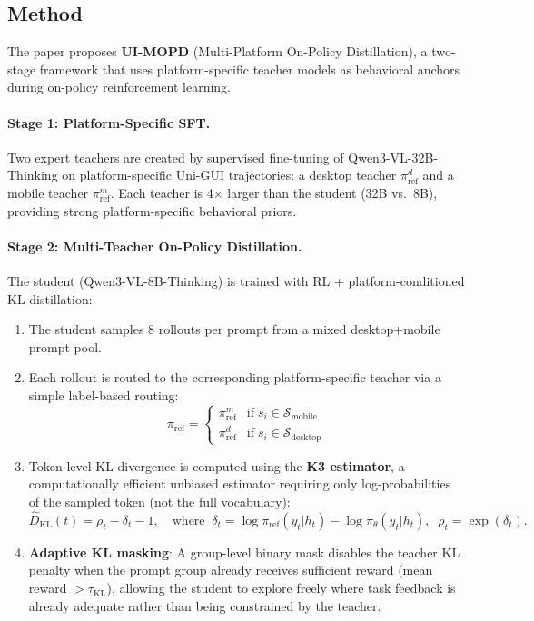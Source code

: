 \documentclass[11pt,a4paper]{article}
\begin{document}
\subsection{Method}

The paper proposes \textbf{UI-MOPD} (Multi-Platform On-Policy Distillation), a two-stage framework that uses platform-specific teacher models as behavioral anchors during on-policy reinforcement learning.

\paragraph{Stage 1: Platform-Specific SFT.} Two expert teachers are created by supervised fine-tuning of Qwen3-VL-32B-Thinking on platform-specific Uni-GUI trajectories: a desktop teacher $\pi_{\mathrm{ref}}^d$ and a mobile teacher $\pi_{\mathrm{ref}}^m$. Each teacher is 4$\times$ larger than the student (32B vs.\ 8B), providing strong platform-specific behavioral priors.

\paragraph{Stage 2: Multi-Teacher On-Policy Distillation.} The student (Qwen3-VL-8B-Thinking) is trained with RL + platform-conditioned KL distillation:
\begin{enumerate}
\item The student samples 8 rollouts per prompt from a mixed desktop+mobile prompt pool.
\item Each rollout is routed to the corresponding platform-specific teacher via a simple label-based routing:
\[
\pi_{\mathrm{ref}} = \begin{cases} \pi_{\mathrm{ref}}^m & \mathrm{if}\; s_i \in \mathcal{S}_{\mathrm{mobile}} \\ \pi_{\mathrm{ref}}^d & \mathrm{if}\; s_i \in \mathcal{S}_{\mathrm{desktop}} \end{cases}
\]
\item Token-level KL divergence is computed using the \textbf{K3 estimator}, a computationally efficient unbiased estimator requiring only log-probabilities of the sampled token (not the full vocabulary):
\[
\hat{D}_{\mathrm{KL}}(t) = \rho_t - \delta_t - 1, \quad \mathrm{where}\;\; \delta_t = \log \pi_{\mathrm{ref}}(y_t | h_t) - \log \pi_\theta(y_t | h_t), \;\; \rho_t = \exp(\delta_t).
\]
\item \textbf{Adaptive KL masking}: A group-level binary mask disables the teacher KL penalty when the prompt group already receives sufficient reward (mean reward $> \tau_{\mathrm{KL}}$), allowing the student to explore freely where task feedback is already adequate rather than being constrained by the teacher.
\end{enumerate}
\end{document}

